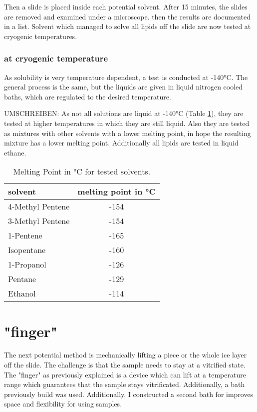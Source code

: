 Then a slide is placed inside each potential solvent. After 15 minutes, the slides are removed and examined under a microscope. then the results are documented in a list. Solvent which managed to solve all lipids off the slide are now tested at cryogenic temperatures.

\subsubsection{at cryogenic temperature}
\label{chapter:meltingtemp}

As solubility is very temperature dependent, a test is conducted at -140°C. The general process is the same, but the liquids are given in liquid nitrogen cooled baths, which are regulated to the desired temperature. 

UMSCHREIBEN:
As not all solutions are liquid at -140°C (Table \ref{table:SchmelztemperaturLösungsmittel}), they are tested at higher temperatures in which they are still liquid. Also they are tested as mixtures with other solvents with a lower melting point, in hope the resulting mixture has a lower melting point. Additionally all lipids are tested in liquid ethane.

\begin{table}[hbt!]
	\centering
	\begin{tabular}{|l|c|}
		\hline
		solvent & melting point in °C \\
		\hline
		\hline
		4-Methyl Pentene & -154 \\ 
		\hline
		3-Methyl Pentene & -154 \\
		\hline
		1-Pentene & -165 \\
		\hline
		Isopentane & -160 \\
		\hline
		1-Propanol & -126 \\
		\hline
		Pentane & -129 \\
		\hline
		Ethanol & -114 \\
		\hline
	\end{tabular}
	\caption{Melting Point in °C for tested solvents.}
	\label{table:SchmelztemperaturLösungsmittel}
\end{table}


\section{"finger"}

The next potential method is mechanically lifting a piece or the whole ice layer off the slide. The challenge is that the sample needs to stay at a vitrified state. The "finger" as previously explained is a device which can lift at a temperature range which guarantees that the sample stays vitrificated. Additionally, a bath previously build was used. Additionally, I constructed a second bath for improves space and flexibility for using samples.

